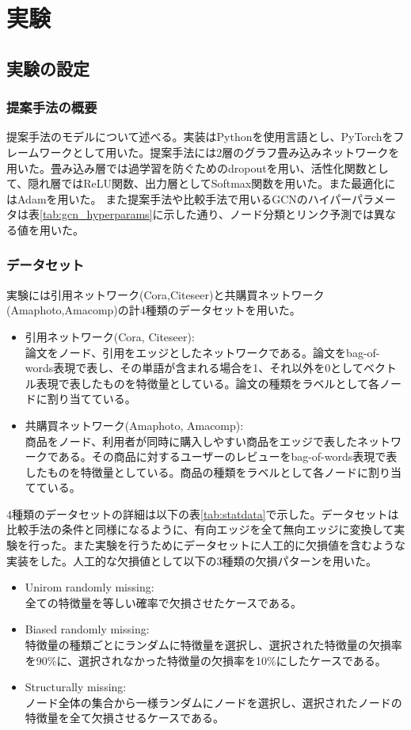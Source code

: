 \chapter{実験}

\section{実験の設定}
\subsection{提案手法の概要}
提案手法のモデルについて述べる。実装はPythonを使用言語とし、PyTorchをフレームワークとして用いた。提案手法には2層のグラフ畳み込みネットワークを用いた。畳み込み層では過学習を防ぐためのdropoutを用い、活性化関数として、隠れ層ではReLU関数、出力層としてSoftmax関数を用いた。また最適化にはAdam\cite{KingmaB14Adam}を用いた。
また提案手法や比較手法で用いるGCNのハイパーパラメータは表\ref{tab:gcn_hyperparams}に示した通り、ノード分類とリンク予測では異なる値を用いた。

\subsection{データセット}
実験には引用ネットワーク(Cora,Citeseer)\cite{sen2008col}と共購買ネットワーク(Amaphoto,Amacomp)\cite{amazondata2015}の計4種類のデータセットを用いた。
\begin{itemize}
\item 引用ネットワーク(Cora, Citeseer):\\
論文をノード、引用をエッジとしたネットワークである。論文をbag-of-words表現で表し、その単語が含まれる場合を1、それ以外を0としてベクトル表現で表したものを特徴量としている。論文の種類をラベルとして各ノードに割り当てている。
\item 共購買ネットワーク(Amaphoto, Amacomp):\\
商品をノード、利用者が同時に購入しやすい商品をエッジで表したネットワークである。その商品に対するユーザーのレビューをbag-of-words表現で表したものを特徴量としている。商品の種類をラベルとして各ノードに割り当てている。
\end{itemize}

4種類のデータセットの詳細は以下の表\ref{tab:statdata}で示した。データセットは比較手法の条件と同様になるように、有向エッジを全て無向エッジに変換して実験を行った。また実験を行うためにデータセットに人工的に欠損値を含むような実装をした。人工的な欠損値として以下の3種類の欠損パターンを用いた。

\begin{itemize}
\item Unirom randomly missing:\\
全ての特徴量を等しい確率で欠損させたケースである。
\item Biased randomly missing:\\
特徴量の種類ごとにランダムに特徴量を選択し、選択された特徴量の欠損率を90\%に、選択されなかった特徴量の欠損率を10\%にしたケースである。
\item Structurally missing:\\
ノード全体の集合から一様ランダムにノードを選択し、選択されたノードの特徴量を全て欠損させるケースである。
\end{itemize}

